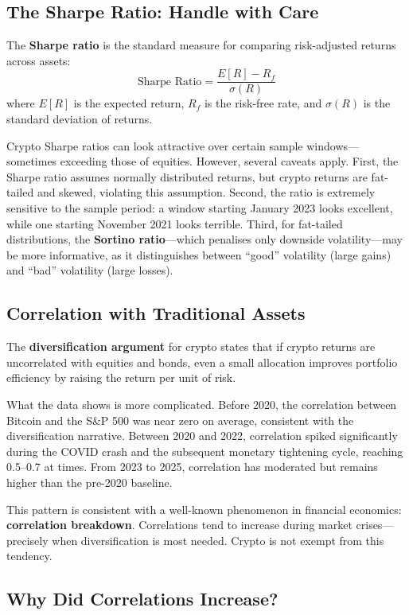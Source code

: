 \documentclass[11pt,a4paper]{article}
\newcommand{\keyword}[1]{\textbf{\textcolor{AccentOrange}{#1}}}
\begin{document}
\subsection{The Sharpe Ratio: Handle with Care}

The \keyword{Sharpe ratio} is the standard measure for comparing risk-adjusted returns across assets:
$$\text{Sharpe Ratio} = \frac{E[R] - R_f}{\sigma(R)}$$
where $E[R]$ is the expected return, $R_f$ is the risk-free rate, and $\sigma(R)$ is the standard deviation of returns.

Crypto Sharpe ratios can look attractive over certain sample windows---sometimes exceeding those of equities. However, several caveats apply. First, the Sharpe ratio assumes normally distributed returns, but crypto returns are fat-tailed and skewed, violating this assumption. Second, the ratio is extremely sensitive to the sample period: a window starting January 2023 looks excellent, while one starting November 2021 looks terrible. Third, for fat-tailed distributions, the \keyword{Sortino ratio}---which penalises only downside volatility---may be more informative, as it distinguishes between ``good'' volatility (large gains) and ``bad'' volatility (large losses).

\subsection{Correlation with Traditional Assets}

The \keyword{diversification argument} for crypto states that if crypto returns are uncorrelated with equities and bonds, even a small allocation improves portfolio efficiency by raising the return per unit of risk.

What the data shows is more complicated. Before 2020, the correlation between Bitcoin and the S\&P 500 was near zero on average, consistent with the diversification narrative. Between 2020 and 2022, correlation spiked significantly during the COVID crash and the subsequent monetary tightening cycle, reaching 0.5--0.7 at times. From 2023 to 2025, correlation has moderated but remains higher than the pre-2020 baseline.

This pattern is consistent with a well-known phenomenon in financial economics: \keyword{correlation breakdown}. Correlations tend to increase during market crises---precisely when diversification is most needed. Crypto is not exempt from this tendency.

\subsection{Why Did Correlations Increase?}
\end{document}
